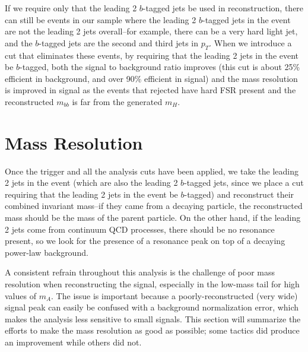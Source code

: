                                                                                                                                     
If we require only that the leading 2 $b$-tagged jets be used in reconstruction, there can                                          
still be events in our sample where the leading 2 $b$-tagged jets in the event are not                                              
the leading 2 jets overall--for example, there can be a very hard light jet, and the $b$-tagged                                     
jets are the second and third jets in $p_T$.  When we introduce a cut that eliminates these events,                                 
by requiring that the leading 2 jets in the event be $b$-tagged, both the signal to background                                      
ratio improves (this cut is about 25\% efficient in background, and over 90\% efficient                                             
in signal) and the mass resolution is improved in signal as the events that rejected have                                           
hard FSR present and the reconstructed $m_{bb}$ is far from the generated $m_H$.    




\section{Mass Resolution}
Once the trigger and all the analysis cuts have been applied, we take the leading 2 jets in the event (which are also the leading 2 $b$-tagged jets, since we place a cut requiring that the leading 2 jets in the event be $b$-tagged) and reconstruct their combined invariant mass--if they came from a decaying particle, the reconstructed mass should be the mass of the parent particle.  On the other hand, if the leading 2 jets come from continuum QCD processes, there should be no resonance present, so we look for the presence of a resonance peak on top of a decaying power-law background.


A consistent refrain throughout this analysis is the challenge of poor mass resolution when reconstructing
the signal, especially in the low-mass tail for high values of $m_A$. The issue is important because a poorly-reconstructed (very wide)
signal peak can easily be confused with a background normalization error, which makes the analysis less
sensitive to small signals. This section will summarize the efforts to make the mass resolution as good
as possible; some tactics did produce an improvement while others did not.

